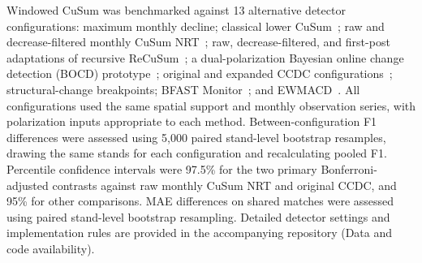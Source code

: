 Windowed CuSum was benchmarked against 13 alternative detector configurations: maximum monthly decline; classical lower CuSum~\citep{Page1954CUSUM}; raw and decrease-filtered monthly CuSum NRT~\citep{Ygorra2024CuSumNRT}; raw, decrease-filtered, and first-post adaptations of recursive ReCuSum~\citep{Ygorra2023ReCuSum}; a dual-polarization Bayesian online change detection (BOCD) prototype~\citep{Bottani2026f-pol_BOCD}; original and expanded CCDC configurations~\citep{Zhu2014CCDC,Bullock2022CCDC_S1}; structural-change breakpoints; BFAST Monitor~\citep{Verbesselt2012BFASTMonitor}; and EWMACD~\citep{Brooks2014EWMACD}. All configurations used the same spatial support and monthly observation series, with polarization inputs appropriate to each method. Between-configuration F1 differences were assessed using 5,000 paired stand-level bootstrap resamples, drawing the same stands for each configuration and recalculating pooled F1. Percentile confidence intervals were 97.5\% for the two primary Bonferroni-adjusted contrasts against raw monthly CuSum NRT and original CCDC, and 95\% for other comparisons. MAE differences on shared matches were assessed using paired stand-level bootstrap resampling. Detailed detector settings and implementation rules are provided in the accompanying repository (Data and code availability).
